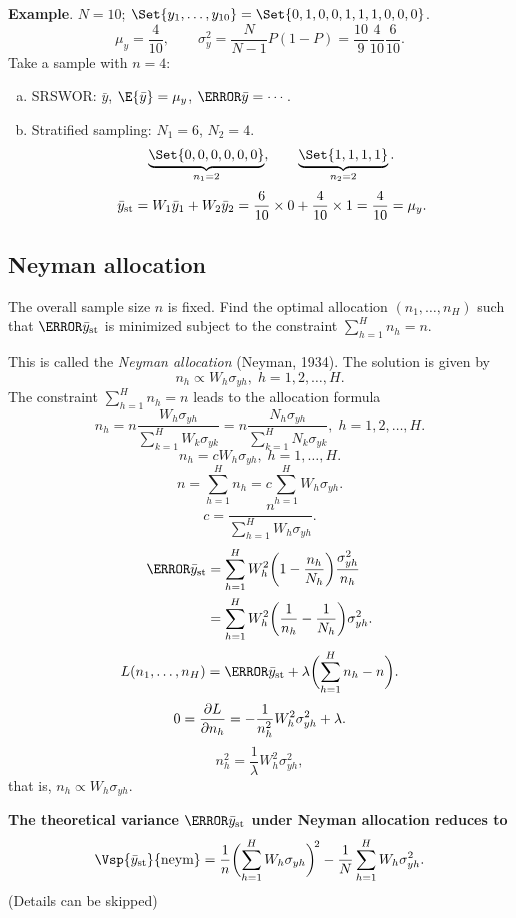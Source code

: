 \textbf{Example}. $ N=10 $; $ \Set{y_1,\ldots,y_{10}}=\Set{0,1,0,0,1,1,1,0,0,0} $.
\[ \mu_y=\frac{4}{10},\qquad \sigma_y^2=\frac{N}{N-1}P(1-P)=\frac{10}{9}\frac{4}{10}\frac{6}{10}. \]
Take a sample with $ n=4 $:
\begin{enumerate}[(a)]
      \item SRSWOR\@: $ \bar{y} $, $ \E{\bar{y}}=\mu_y $, $ \V{\bar{y}}=\cdots $.
      \item Stratified sampling: $ N_1=6 $, $ N_2=4 $.
            \[ \underbrace{\Set{0,0,0,0,0,0}}_{n_1=2},\qquad \underbrace{\Set{1,1,1,1}}_{n_2=2}. \]
            \[ \bar{y}_{\text{st}}=W_1\bar{y}_1+W_2\bar{y}_2=\frac{6}{10}\times 0+\frac{4}{10}\times 1=\frac{4}{10}=\mu_y. \]
\end{enumerate}
\subsection{Neyman allocation}

The overall sample size $n$ is fixed. Find the optimal allocation
$ (n_1,\ldots,n_H) $ such that $ \V{\bar{y}_{\st}} $ is minimized subject to the constraint $ \sum_{h=1}^{H}n_h=n $.

This is called the \emph{Neyman allocation} (Neyman, 1934). The solution is given by
\[ n_h\propto W_h\sigma_{yh},\; h=1,2,\ldots,H. \]
The constraint $ \sum_{h=1}^{H}n_h=n $ leads to the allocation formula
\[ n_h=n \frac{W_h \sigma_{yh}}{\sum_{k=1}^{H}W_k \sigma_{yk}}=n \frac{N_h \sigma_{yh}}{\sum_{k=1}^{H}N_k \sigma_{yk}},\; h=1,2,\ldots,H. \]
\[ n_h=c W_h \sigma_{yh},\; h=1,\ldots,H. \]
\[ n=\sum_{h=1}^{H}n_h=c \sum_{h=1}^{H}W_h \sigma_{yh}. \]
\[ c=\frac{n}{\sum_{h=1}^{H}W_h \sigma_{yh}}. \]
\begin{align*}
      \V{\bar{y}_{\st}}
       & =\sum_{h=1}^{H}W_h^2\biggl(1-\frac{n_h}{N_h}\biggr)\frac{\sigma_{yh}^2}{n_h} \\
       & =\sum_{h=1}^{H}W_h^2\biggl(\frac{1}{n_h}-\frac{1}{N_h}\biggr)\sigma_{yh}^2.
\end{align*}
\[ L(n_1,\ldots,n_H)=\V{\bar{y}_{\st}}+\lambda\biggl(\sum_{h=1}^{H}n_h-n\biggr). \]
\[ 0=\pdv{L}{n_h}=-\frac{1}{n_h^2}W_h^2\sigma_{yh}^2+\lambda. \]
\[ n_h^2=\frac{1}{\lambda}W_h^2\sigma_{yh}^2, \]
that is, $ n_h\propto W_h \sigma_{yh} $.

\textbf{The theoretical variance $ \V{\bar{y}_{\st}} $ under Neyman allocation reduces
      to}
\[ \Vsp{\bar{y}_{\st}}{\text{neym}}=\frac{1}{n}\biggl(\sum_{h=1}^{H}W_h \sigma_{yh}\biggr)^{\!2}-\frac{1}{N}\sum_{h=1}^{H}W_h \sigma_{yh}^2. \]
(Details can be skipped)

